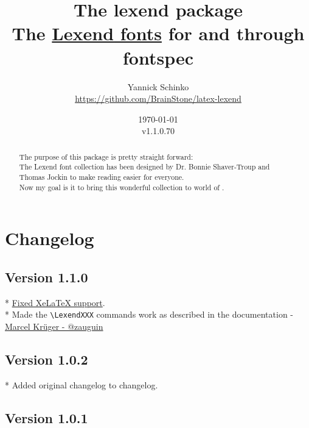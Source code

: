 \documentclass[oneside,a4paper]{l3doc}
\begin{document}
\title{
	The \textsf{lexend} package\\
	\large{The \href{https://www.lexend.com/}{\textsf{Lexend} fonts} for  and
	 through \textsf{fontspec}}
}
\author{
	Yannick Schinko\\
	\texorpdfstring{\url{https://github.com/BrainStone/latex-lexend}}{}
}
\date{
	\today\\
	v1.1.0.70
}

\maketitle

\bigskip

\begin{abstract}
The purpose of this package is pretty straight forward:\\
The Lexend font collection has been designed by Dr. Bonnie Shaver-Troup and Thomas Jockin to make
reading easier for everyone.\\
Now my goal is it to bring this wonderful collection to world of .
\end{abstract}

\bigskip
\tableofcontents
\newpage


\section{Changelog}

\hypertarget{version-1.1.0}{%
\subsection*{Version 1.1.0}\label{version-1.1.0}}

* \href{https://github.com/BrainStone/latex-lexend/issues/1}{Fixed XeLaTeX support}.\\
* Made the \texttt{\textbackslash{}LexendXXX} commands work as described in the documentation -
\href{https://github.com/zauguin}{Marcel Krüger - @zauguin}

\hypertarget{version-1.0.2}{%
\subsection*{Version 1.0.2}\label{version-1.0.2}}

* Added original changelog to changelog.

\hypertarget{version-1.0.1}{%
\subsection*{Version 1.0.1}\label{version-1.0.1}}
\end{document}
